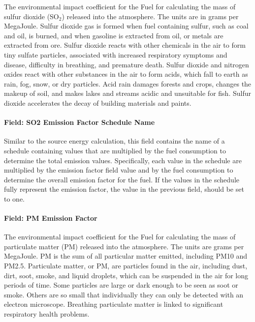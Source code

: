 The environmental impact coefficient for the Fuel for calculating the mass of sulfur dioxide (SO\(_{2}\)) released into the atmosphere. The units are in grams per MegaJoule. Sulfur dioxide gas is formed when fuel containing sulfur, such as coal and oil, is burned, and when gasoline is extracted from oil, or metals are extracted from ore. Sulfur dioxide reacts with other chemicals in the air to form tiny sulfate particles, associated with increased respiratory symptoms and disease, difficulty in breathing, and premature death. Sulfur dioxide and nitrogen oxides react with other substances in the air to form acids, which fall to earth as rain, fog, snow, or dry particles. Acid rain damages forests and crops, changes the makeup of soil, and makes lakes and streams acidic and unsuitable for fish. Sulfur dioxide accelerates the decay of building materials and paints.

\paragraph{Field: SO2 Emission Factor Schedule Name}\label{field-so2-emission-factor-schedule-name}

Similar to the source energy calculation, this field contains the name of a schedule containing values that are multiplied by the fuel consumption to determine the total emission values. Specifically, each value in the schedule are multiplied by the emission factor field value and by the fuel consumption to determine the overall emission factor for the fuel. If the values in the schedule fully represent the emission factor, the value in the previous field, should be set to one.

\paragraph{Field: PM Emission Factor}\label{field-pm-emission-factor}

The environmental impact coefficient for the Fuel for calculating the mass of particulate matter (PM) released into the atmosphere. The units are grams per MegaJoule. PM is the sum of all particular matter emitted, including PM10 and PM2.5. Particulate matter, or PM, are particles found in the air, including dust, dirt, soot, smoke, and liquid droplets, which can be suspended in the air for long periods of time. Some particles are large or dark enough to be seen as soot or smoke. Others are so small that individually they can only be detected with an electron microscope. Breathing particulate matter is linked to significant respiratory health problems.

